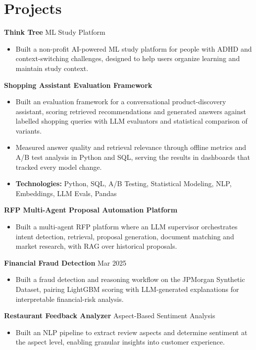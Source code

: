 \documentclass[10pt,a4paper]{article}
\begin{document}
\section{Projects}
\textbf{Think Tree} \textbar{} ML Study Platform\par
\begin{itemize}
  \item Built a non-profit AI-powered ML study platform for people with ADHD and context-switching challenges, designed to help users organize learning and maintain study context.
\end{itemize}
\textbf{Shopping Assistant Evaluation Framework}\par
\begin{itemize}
  \item Built an evaluation framework for a conversational product-discovery assistant, scoring retrieved recommendations and generated answers against labelled shopping queries with LLM evaluators and statistical comparison of variants.
  \item Measured answer quality and retrieval relevance through offline metrics and A/B test analysis in Python and SQL, serving the results in dashboards that tracked every model change.
  \item \textbf{Technologies:} Python, SQL, A/B Testing, Statistical Modeling, NLP, Embeddings, LLM Evals, Pandas
\end{itemize}
\textbf{RFP Multi-Agent Proposal Automation Platform}\par
\begin{itemize}
  \item Built a multi-agent RFP platform where an LLM supervisor orchestrates intent detection, retrieval, proposal generation, document matching and market research, with RAG over historical proposals.
\end{itemize}
\textbf{Financial Fraud Detection} \textbar{} Mar 2025\par
\begin{itemize}
  \item Built a fraud detection and reasoning workflow on the JPMorgan Synthetic Dataset, pairing LightGBM scoring with LLM-generated explanations for interpretable financial-risk analysis.
\end{itemize}
\textbf{Restaurant Feedback Analyzer} \textbar{} Aspect-Based Sentiment Analysis\par
\begin{itemize}
  \item Built an NLP pipeline to extract review aspects and determine sentiment at the aspect level, enabling granular insights into customer experience.
\end{itemize}
\end{document}
